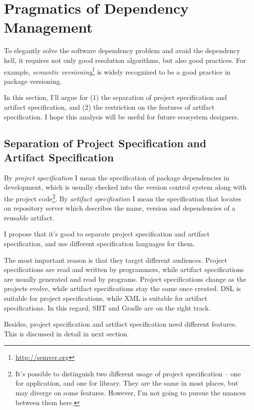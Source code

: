 \section{Pragmatics of Dependency Management}

\label{pragmatics}

To elegantly solve the software dependency problem and avoid the dependency hell, it requires not only good resolution algorithms, but also good practices. For example, \emph{semantic versioning}\footnote{\url{http://semver.org}} is widely recognized to be a good practice in package versioning.

In this section, I'll argue for (1) the separation of project specification and artifact specification, and (2) the restriction on the features of artifact specification. I hope this analysis will be useful for future ecosystem designers.

\subsection{Separation of Project Specification and Artifact Specification}

By \emph{project specification} I mean the specification of package dependencies in development, which is usually checked into the version control system along with the project code\footnote{It's possible to distinguish two different usage of project specification -- one for application, and one for library. They are the same in most places, but may diverge on some features. However, I'm not going to pursue the nuances between them here.}. By \emph{artifact specification} I mean the specification that locates on repository server which describes the name, version and dependencies of a reusable artifact.

I propose that it's good to separate project specification and artifact specification, and use different specification languages for them.

The most important reason is that they target different audiences. Project specifications are read and written by programmers, while artifact specifications are usually generated and read by programs. Project specifications change as the projects evolve, while artifact specifications stay the same once created. DSL is suitable for project specifications, while XML is suitable for artifact specifications. In this regard, SBT and Gradle are on the right track.

Besides, project specification and artifact specification need different features. This is discussed in detail in next section.

